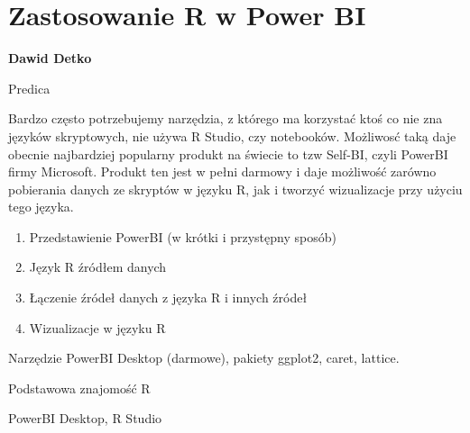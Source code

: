 \documentclass[\main/boa.tex]{subfiles}
\begin{document}
\section{Zastosowanie R w Power BI}

\begin{minipage}{0.915\textwidth}
\centering
{\bf {} Dawid Detko}
\end{minipage}

\vskip 0.3cm

\begin{affiliations}
\begin{minipage}{0.915\textwidth}
\centering
\large Predica  \\[2pt]
\end{minipage}
\end{affiliations}

\vskip 0.8cm

\opiswarsztatu Bardzo często potrzebujemy narzędzia, z którego ma korzystać ktoś co nie zna języków skryptowych, nie używa R Studio, czy notebooków. Możliwosć taką daje obecnie najbardziej popularny produkt na świecie to tzw Self-BI, czyli PowerBI firmy Microsoft. Produkt ten jest w pełni darmowy i daje możliwość zarówno pobierania danych ze skryptów w języku R, jak i tworzyć wizualizacje przy użyciu tego języka.

\planwarsztatu
\begin{enumerate}
\item Przedstawienie PowerBI (w krótki i przystępny sposób)
\item Język R źródłem danych
\item Łączenie źródeł danych z języka R i innych źródeł
\item Wizualizacje w języku R
\end{enumerate}	 

\pakiety Narzędzie PowerBI Desktop (darmowe), pakiety ggplot2, caret, lattice.

\umiejetnosci Podstawowa znajomość R

\wymagania PowerBI Desktop, R Studio
\end{document}
